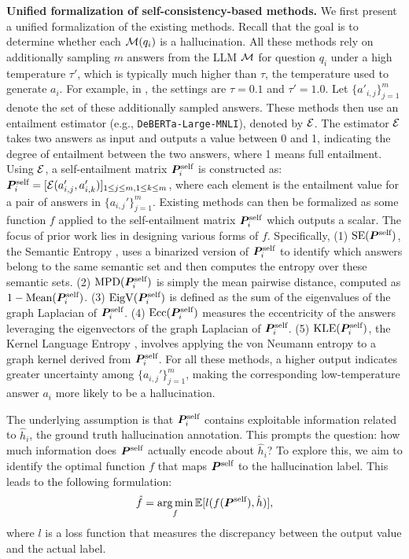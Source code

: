 \textbf{Unified formalization of self-consistency-based methods.} We first present a unified formalization of the existing methods. Recall that the goal is to determine whether each ${\mathcal{M}}(q_i)$ is a hallucination. All these methods rely on additionally sampling $m$ answers from the LLM ${\mathcal{M}}$ for question $q_i$ under a high temperature $\tau'$, which is typically much higher than $\tau$, the temperature used to generate $a_i$. For example, in \cite{farquhar2024detecting}, the settings are $\tau = 0.1$ and $\tau' = 1.0$. Let $\{a'_{i,j}\}_{j=1}^{m}$ denote the set of these additionally sampled answers. These methods then use an entailment estimator (e.g., \texttt{DeBERTa-Large-MNLI}), denoted by ${\mathcal{E}}$. The estimator ${\mathcal{E}}$ takes two answers as input and outputs a value between 0 and 1, indicating the degree of entailment between the two answers, where 1 means full entailment. Using ${\mathcal{E}}$, a self-entailment matrix ${\bm{P}}^{\text{self}}_i$ is constructed as: $
    {\bm{P}}^{\text{self}}_i = [ {\mathcal{E}}( a'_{i, j}, a'_{i, k} )  ]_{1\leq j\leq m, 1\leq k\leq m} $,
where each element is the entailment value for a pair of answers in $\{a_{i,j}'\}_{j=1}^m$. Existing methods can then be formalized as some function $f$ applied to the self-entailment matrix ${\bm{P}}^{\text{self}}_i$ which outputs a scalar. The focus of prior work lies in designing various forms of 
$f$. Specifically, (1) $\text{SE}({\bm{P}}^{\text{self}})$, the Semantic Entropy \cite{farquhar2024detecting}, uses a binarized version of ${\bm{P}}^{\text{self}}_i$ to identify which answers belong to the same semantic set and then computes the entropy over these semantic sets. (2) $\text{MPD}({\bm{P}}^{\text{self}}_i)$ \cite{lin2023generating,manakul2023selfcheckgpt} is simply the mean pairwise distance, computed as $1 - \text{Mean}({\bm{P}}^{\text{self}}_i)$. (3) $\text{EigV}({\bm{P}}^{\text{self}}_i)$ \cite{lin2023generating} is defined as the sum of the eigenvalues of the graph Laplacian of ${\bm{P}}^{\text{self}}_i$. (4) $\text{Ecc}({\bm{P}}^{\text{self}}_i)$ \cite{lin2023generating} measures the eccentricity of the answers leveraging the eigenvectors of the graph Laplacian of ${\bm{P}}^{\text{self}}_i$. (5) $\text{KLE}({\bm{P}}^{\text{self}}_i)$, the Kernel Language Entropy \cite{nikitin2024kernel}, involves applying the von Neumann entropy to a graph kernel derived from ${\bm{P}}^{\text{self}}_i$.
For all these methods, a higher output indicates greater uncertainty among $\{a_{i,j}'\}_{j=1}^m$, making the corresponding low-temperature answer $a_i$ more likely to be a hallucination. 

The underlying assumption is that ${\bm{P}}^{\text{self}}_i$ contains exploitable information related to $\hat{h}_i$, the ground truth hallucination annotation. This prompts the question: how much information does ${\bm{P}}^{\text{self}}$ actually encode about $\hat{h}_i$? To explore this, we aim to identify the optimal function $f$ that maps ${\bm{P}}^{\text{self}}$ to the hallucination label. This leads to the following formulation:
\vspace{-.2cm}
\begin{equation}
\label{eq: loss_gcn}
   \hat{f} = \operatorname*{arg\,min}_{f} \mathbb{E}[l(f({\bm{P}}^{\text{self}}), \hat{h})],    
\end{equation}
where \(l\) is a loss function that measures the discrepancy between the output value and the actual label. 

